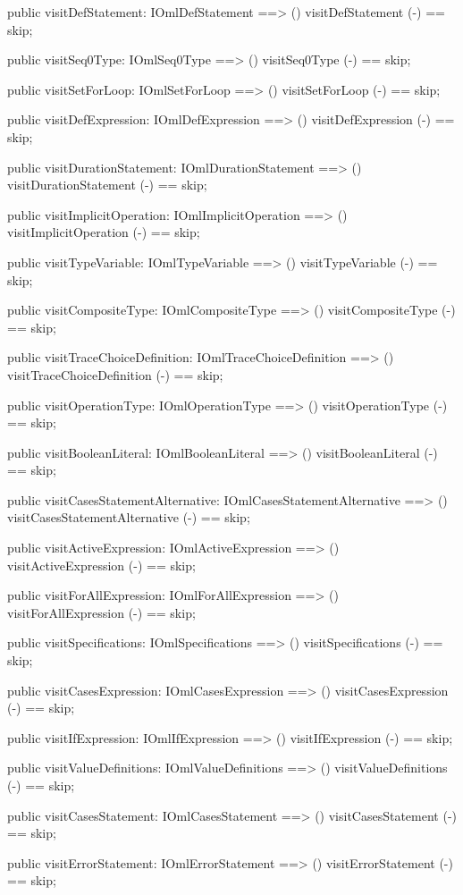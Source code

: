 \begin{vdm_al}
  public visitDefStatement: IOmlDefStatement ==> ()
  visitDefStatement (-) == skip;

  public visitSeq0Type: IOmlSeq0Type ==> ()
  visitSeq0Type (-) == skip;

  public visitSetForLoop: IOmlSetForLoop ==> ()
  visitSetForLoop (-) == skip;

  public visitDefExpression: IOmlDefExpression ==> ()
  visitDefExpression (-) == skip;

  public visitDurationStatement: IOmlDurationStatement ==> ()
  visitDurationStatement (-) == skip;

  public visitImplicitOperation: IOmlImplicitOperation ==> ()
  visitImplicitOperation (-) == skip;

  public visitTypeVariable: IOmlTypeVariable ==> ()
  visitTypeVariable (-) == skip;

  public visitCompositeType: IOmlCompositeType ==> ()
  visitCompositeType (-) == skip;

  public visitTraceChoiceDefinition: IOmlTraceChoiceDefinition ==> ()
  visitTraceChoiceDefinition (-) == skip;

  public visitOperationType: IOmlOperationType ==> ()
  visitOperationType (-) == skip;

  public visitBooleanLiteral: IOmlBooleanLiteral ==> ()
  visitBooleanLiteral (-) == skip;

  public visitCasesStatementAlternative: IOmlCasesStatementAlternative ==> ()
  visitCasesStatementAlternative (-) == skip;

  public visitActiveExpression: IOmlActiveExpression ==> ()
  visitActiveExpression (-) == skip;

  public visitForAllExpression: IOmlForAllExpression ==> ()
  visitForAllExpression (-) == skip;

  public visitSpecifications: IOmlSpecifications ==> ()
  visitSpecifications (-) == skip;

  public visitCasesExpression: IOmlCasesExpression ==> ()
  visitCasesExpression (-) == skip;

  public visitIfExpression: IOmlIfExpression ==> ()
  visitIfExpression (-) == skip;

  public visitValueDefinitions: IOmlValueDefinitions ==> ()
  visitValueDefinitions (-) == skip;

  public visitCasesStatement: IOmlCasesStatement ==> ()
  visitCasesStatement (-) == skip;

  public visitErrorStatement: IOmlErrorStatement ==> ()
  visitErrorStatement (-) == skip;


\end{vdm_al}
